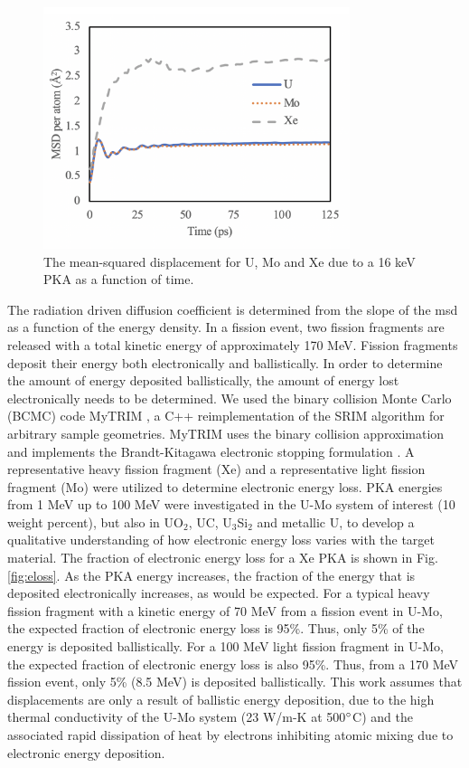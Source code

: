 \documentclass[review]{elsarticle}
\begin{document}
\begin{figure}[h]
 \centering
 \includegraphics[width=0.8\textwidth]{1_msd_vs_time.png} 
 \caption{ The mean-squared displacement for U, Mo and Xe due to a 16 keV PKA as a function of time.}
 \label{fig:msd}
\end{figure}

The radiation driven diffusion coefficient is determined from the slope of the msd as a function of the energy density. In a fission event, two fission fragments are released with a total kinetic energy of approximately 170 MeV. Fission fragments deposit their energy both electronically and ballistically. In order to determine the amount of energy deposited ballistically, the amount of energy lost electronically needs to be determined. We used the binary collision Monte Carlo (BCMC) code MyTRIM \cite{myTRIM}, a C++ reimplementation of the SRIM algorithm for arbitrary sample geometries. MyTRIM uses the binary collision approximation and implements the Brandt-Kitagawa electronic stopping formulation \cite{brandt1982}. A representative heavy fission fragment (Xe) and a representative light fission fragment (Mo) were utilized to determine electronic energy loss. PKA energies from 1 MeV up to 100 MeV were investigated in the U-Mo system of interest (10 weight percent), but also in UO$_2$, UC, U$_3$Si$_2$ and metallic U, to develop a qualitative understanding of how electronic energy loss varies with the target material. The fraction of electronic energy loss for a Xe PKA is shown in Fig. \ref{fig:eloss}. As the PKA energy increases, the fraction of the energy that is deposited electronically increases, as would be expected. For a typical heavy fission fragment with a kinetic energy of 70 MeV from a fission event in U-Mo, the expected fraction of electronic energy loss is 95\%. Thus, only 5\% of the energy is deposited ballistically. For a 100 MeV light fission fragment in U-Mo, the expected fraction of electronic energy loss is also 95\%. Thus, from a 170 MeV fission event, only 5\% (8.5 MeV) is deposited ballistically. This work assumes that displacements are only a result of ballistic energy deposition, due to the high thermal conductivity of the U-Mo system (23 W/m-K at 500$\degree$C) \cite{umo_handbook} and the associated rapid dissipation of heat by electrons inhibiting atomic mixing due to electronic energy deposition. 
\end{document}
